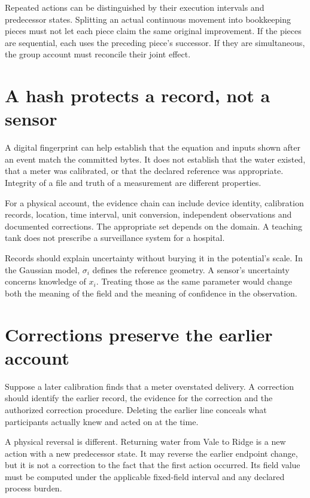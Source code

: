 Repeated actions can be distinguished by their execution intervals and predecessor states. Splitting an actual continuous movement into bookkeeping pieces must not let each piece claim the same original improvement. If the pieces are sequential, each uses the preceding piece's successor. If they are simultaneous, the group account must reconcile their joint effect.

\section{A hash protects a record, not a sensor}
A digital fingerprint can help establish that the equation and inputs shown after an event match the committed bytes. It does not establish that the water existed, that a meter was calibrated, or that the declared reference was appropriate. Integrity of a file and truth of a measurement are different properties.

For a physical account, the evidence chain can include device identity, calibration records, location, time interval, unit conversion, independent observations and documented corrections. The appropriate set depends on the domain. A teaching tank does not prescribe a surveillance system for a hospital.

Records should explain uncertainty without burying it in the potential's scale. In the Gaussian model, $\sigma_i$ defines the reference geometry. A sensor's uncertainty concerns knowledge of $x_i$. Treating those as the same parameter would change both the meaning of the field and the meaning of confidence in the observation.

\section{Corrections preserve the earlier account}
Suppose a later calibration finds that a meter overstated delivery. A correction should identify the earlier record, the evidence for the correction and the authorized correction procedure. Deleting the earlier line conceals what participants actually knew and acted on at the time.

A physical reversal is different. Returning water from Vale to Ridge is a new action with a new predecessor state. It may reverse the earlier endpoint change, but it is not a correction to the fact that the first action occurred. Its field value must be computed under the applicable fixed-field interval and any declared process burden.

